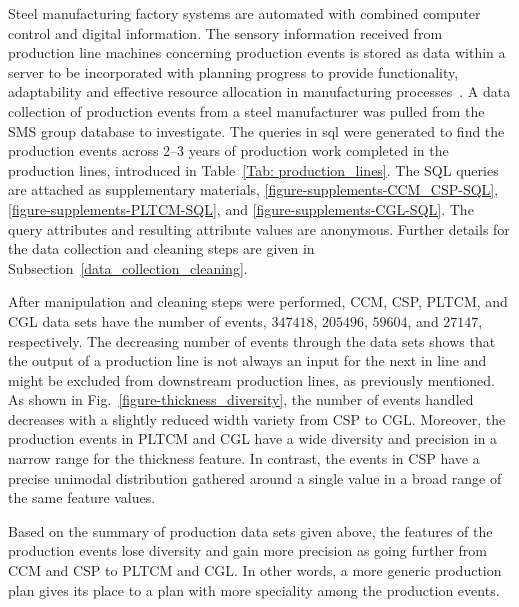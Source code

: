 Steel manufacturing factory systems are automated with combined computer control and digital information. The sensory information received from production line machines concerning production events is stored as data within a server to be incorporated with planning progress to provide functionality, adaptability and effective resource allocation in manufacturing processes~\cite{Saadaoui2019}. A data collection of production events from a steel manufacturer was pulled from the SMS group database to investigate. The queries in \ac{sql} were generated to find the production events across $2$--$3$ years of production work completed in the production lines, introduced in Table~\ref{Tab: production_lines}. The SQL queries are attached as supplementary materials, \ref{figure-supplements-CCM_CSP-SQL}, \ref{figure-supplements-PLTCM-SQL}, and \ref{figure-supplements-CGL-SQL}. The query attributes and resulting attribute values are anonymous. Further details for the data collection and cleaning steps are given in Subsection~\ref{data_collection_cleaning}.

After manipulation and cleaning steps were performed, CCM, CSP, PLTCM, and CGL data sets have the number of events, $347418$, $205496$, $59604$, and $27147$, respectively. The decreasing number of events through the data sets shows that the output of a production line is not always an input for the next in line and might be excluded from downstream production lines, as previously mentioned. As shown in Fig.~\ref{figure-thickness_diversity}, the number of events handled decreases with a slightly reduced width variety from CSP to CGL. Moreover, the production events in PLTCM and CGL have a wide diversity and precision in a narrow range for the thickness feature. In contrast, the events in CSP have a precise unimodal distribution gathered around a single value in a broad range of the same feature values.



Based on the summary of production data sets given above, the features of the production events lose diversity and gain more precision as going further from CCM and CSP to PLTCM and CGL. In other words, a more generic production plan gives its place to a plan with more speciality among the production events.



